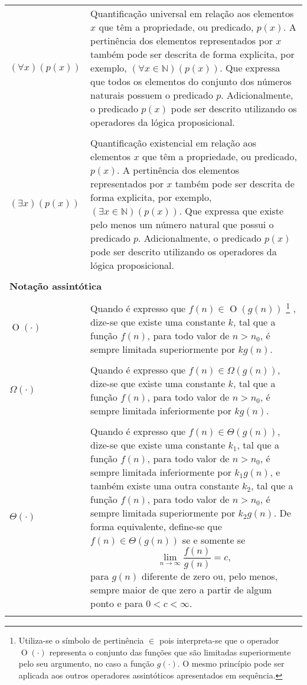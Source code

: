 \begin{longtable}{p{1in}p{4.5in}}
$(\forall x)(p(x))$ \dotfill &
\index{quantificador!universal}%
Quantificação universal em relação aos elementos $x$ que têm a propriedade,
ou predicado, $p(x)$.
A pertinência dos elementos representados por $x$ também pode ser descrita de
forma explicita, por exemplo, $(\forall x \in \mathbb{N})(p(x))$.
Que expressa que todos os elementos do conjunto dos números naturais possuem o
predicado $p$.
Adicionalmente, o predicado $p(x)$ pode ser descrito utilizando os operadores
da lógica proposicional.
\tabularnewline
\tabularnewline

$(\exists x)(p(x))$ \dotfill &
\index{quantificador!existencial}%
Quantificação existencial em relação aos elementos $x$ que têm a propriedade,
ou predicado, $p(x)$.
A pertinência dos elementos representados por $x$ também pode ser descrita de
forma explicita, por exemplo, $(\exists x \in \mathbb{N})(p(x))$.
Que expressa que existe pelo menos um número natural que possui o predicado
$p$.
Adicionalmente, o predicado $p(x)$ pode ser descrito utilizando os operadores
da lógica proposicional.
\tabularnewline
\tabularnewline

\multicolumn{2}{l}{\bf Notação assintótica}
\tabularnewline
\tabularnewline

$\operatorname{O}(\cdot)$ \dotfill &
\index{$\operatorname{O}(\cdot)$}%
Quando é expresso que $f(n) \in \operatorname{O}(g(n))$%
\footnote{Utiliza-se o símbolo de pertinência $\in$ pois interpreta-se que o
operador $\operatorname{O}(\cdot)$ representa o conjunto das funções que são
limitadas superiormente pelo seu argumento, no caso a função $g(\cdot)$.
O mesmo princípio pode ser aplicada aos outros operadores assintóticos
apresentados em sequência.}%
, dize-se que existe uma constante $k$, tal que a função $f(n)$, para todo
valor de $n>n_0$, é sempre limitada superiormente por $kg(n)$.
\tabularnewline
\tabularnewline

$\Omega(\cdot)$ \dotfill &
\index{$\Omega(\cdot)$}%
Quando é expresso que $f(n)\in\Omega(g(n))$, dize-se que existe uma constante
$k$, tal que a função $f(n)$, para todo valor de $n>n_0$, é sempre limitada
inferiormente por $kg(n)$.
\tabularnewline
\tabularnewline

$\Theta(\cdot)$ \dotfill &
\index{$\Theta(\cdot)$}%
Quando é expresso que $f(n)\in\Theta(g(n))$, dize-se que existe uma constante
$k_1$, tal que a função $f(n)$, para todo valor de $n>n_0$, é sempre limitada
inferiormente por $k_1g(n)$, e também existe uma outra constante $k_2$, tal que
a função $f(n)$, para todo valor de $n>n_0$, é sempre limitada superiormente
por $k_2g(n)$.
De forma equivalente, define-se que $f(n)\in\Theta(g(n))$ se e somente se
\begin{equation*}
\lim_{n\rightarrow\infty}\frac{f(n)}{g(n)}=c\text{,}
\end{equation*}
para $g(n)$ diferente de zero ou, pelo menos, sempre maior de que zero a partir
de algum ponto e para $0<c<\infty$.
\tabularnewline
\tabularnewline


\end{longtable}
